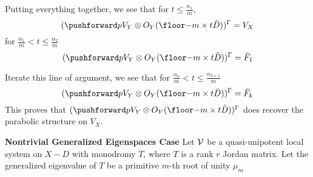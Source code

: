 \documentclass{article}
\begin{document}
Putting everything together, we see that for $t \le \frac{\alpha_1}{m}$, 
\[
    \invariantt = V_X
\]
for $\frac{\alpha_1}{m} < t \le \frac{\alpha_2}{m}$
\[
    \invariantt = \bar{F}_1
\]

Iterate this line of argument, we see that for 
$\frac{\alpha_k}{m} < t \le \frac{\alpha_{k+1}}{m}$
\[
    \invariantt = \bar{F}_k
\]
This proves that $\invariantt$ does recover the parabolic structure on $V_X$.

\textbf{Nontrivial Generalized Eigenspaces Case}   
Let $\mathcal{V}$ be a quasi-unipotent local system on $X - D$ with monodromy $T$, 
where $T$ is a rank $r$ Jordan matrix. Let the generalized eigenvalue of $T$ be a primitive $m$-th
root of unity $\mu_m$ 
\end{document}
